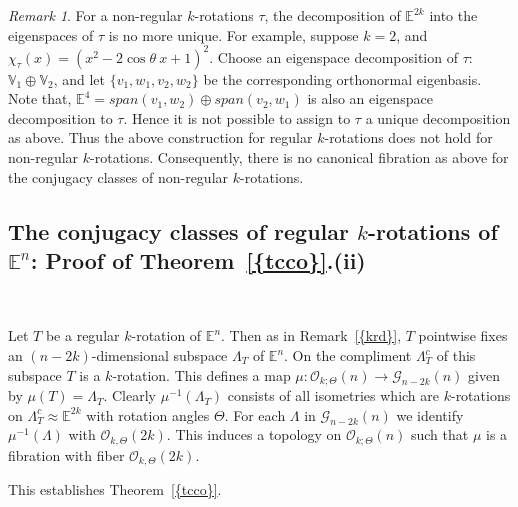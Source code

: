 \documentclass[11pt]{amsart}
\theoremstyle{definition}
\theoremstyle{remark}
\newtheorem{remark}[theorem]{Remark}
\numberwithin{equation}{section}
\theoremstyle{plain}
\begin{document}
\begin{remark}\label{2}
 For a non-regular $k$-rotations $\tau$, the decomposition of ${\mathbb E}^{2k}$ into the eigenspaces of $\tau$ is no more unique. For example, suppose $k=2$, and $\chi_{\tau}(x)=(x^2-2 \cos \theta \ x +1)^2$. Choose an eigenspace decomposition of $\tau$: ${\mathbb V}_1 \oplus {\mathbb V}_2$, and let $\{v_1, w_1, v_2, w_2\}$ be the corresponding orthonormal eigenbasis. Note that,  ${\mathbb E}^4=span(v_1, w_2) \oplus span(v_2, w_1)$ is also an eigenspace decomposition to $\tau$.  Hence it is not possible to assign to $\tau$ a unique decomposition as above. Thus the above construction for regular $k$-rotations does not hold  for non-regular $k$-rotations. Consequently, there is no canonical fibration as above for the conjugacy classes of non-regular $k$-rotations. 
\end{remark}

\subsection{The conjugacy classes of regular $k$-rotations of ${\mathbb E}^n$: Proof of {Theorem~\ref{{tcco}}}.(ii)}  \ \ 

Let $T$ be a regular $k$-rotation of ${\mathbb E}^n$. Then as in {Remark~\ref{{krd}}}, $T$ pointwise fixes an $(n-2k)$-dimensional subspace $\Lambda_T$ of ${\mathbb E}^n$. On the compliment $\Lambda^c_T$ of this subspace $T$ is a $k$-rotation. This defines a map
$\mu: {\mathcal O}_{k;\Theta}(n) \to {\mathcal G}_{n-2k}(n)$ given by $\mu(T)=\Lambda_T$. Clearly $\mu^{-1}(\Lambda_T)$ consists of all isometries which are $k$-rotations on $\Lambda^c_T \approx {\mathbb E}^{2k}$ with rotation angles $\Theta$. For each $\Lambda$ in ${\mathcal G}_{n-2k}(n)$ we identify $\mu^{-1}(\Lambda)$ with ${\mathcal O}_{k,\Theta}(2k)$. This induces a topology on ${\mathcal O}_{k;\Theta}(n)$ such that $\mu$ is a fibration with fiber ${\mathcal O}_{k,\Theta}(2k)$. 

This establishes {Theorem~\ref{{tcco}}}.
\end{document}
